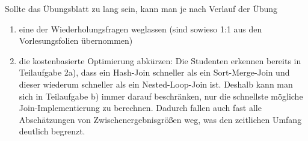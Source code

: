 \begin{note}
Sollte das Übungsblatt zu lang sein, kann man je nach Verlauf der Übung
\begin{enumerate}
  \item eine der Wiederholungsfragen weglassen (sind sowieso 1:1 aus den Vorlesungsfolien übernommen)
  \item die kostenbasierte Optimierung abkürzen: Die Studenten erkennen bereits in Teilaufgabe 2a), dass ein Hash-Join schneller als ein Sort-Merge-Join und dieser wiederum schneller als ein Nested-Loop-Join ist. Deshalb kann man sich in Teilaufgabe b) immer darauf beschränken, nur die schnellste mögliche Join-Implementierung zu berechnen. Dadurch fallen auch fast alle Abschätzungen von Zwischenergebnisgrößen weg, was den zeitlichen Umfang deutlich begrenzt.
\end{enumerate}
\end{note}
